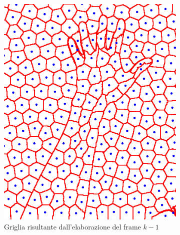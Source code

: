 \documentclass[12pt,a4paper,oneside]{article}
\begin{document}
\begin{figure}[!htb]	
	\centering
	\begin{subfigure}[t]{.325\textwidth}
		\includegraphics[width=\textwidth]{resources/images/mascheraIntermedia_memory.png}
		\captionsetup{justification=centering}
		\caption{Griglia risultante dall'elaborazione del frame \mbox{$k - 1$}}	
	\end{subfigure}%
	\hfill
	\begin{subfigure}[t]{.325\textwidth}

\end{subfigure}
\end{figure}
\end{document}
